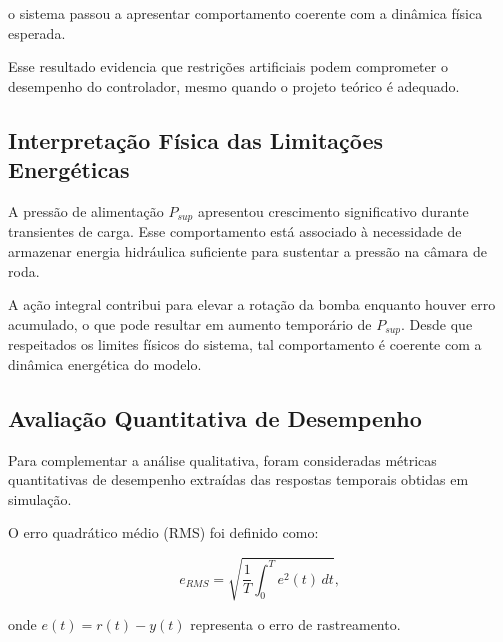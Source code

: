 o sistema passou a apresentar comportamento coerente com a dinâmica física esperada.

Esse resultado evidencia que restrições artificiais podem comprometer o desempenho do controlador, mesmo quando o projeto teórico é adequado.

\subsection{Interpretação Física das Limitações Energéticas}
\label{sec:interpretacao-limitacoes-energeticas}

A pressão de alimentação $P_{sup}$ apresentou crescimento significativo durante transientes de carga. Esse comportamento está associado à necessidade de armazenar energia hidráulica suficiente para sustentar a pressão na câmara de roda.

A ação integral contribui para elevar a rotação da bomba enquanto houver erro acumulado, o que pode resultar em aumento temporário de $P_{sup}$. Desde que respeitados os limites físicos do sistema, tal comportamento é coerente com a dinâmica energética do modelo.

\subsection{Avaliação Quantitativa de Desempenho}
\label{sec:avaliacao-quantitativa-desempenho}

Para complementar a análise qualitativa, foram consideradas métricas quantitativas de desempenho extraídas das respostas temporais obtidas em simulação.

O erro quadrático médio (RMS) foi definido como:

\begin{equation}
e_{RMS} = \sqrt{\frac{1}{T} \int_0^T e^2(t)\, dt},
\end{equation}

onde $e(t) = r(t) - y(t)$ representa o erro de rastreamento.

